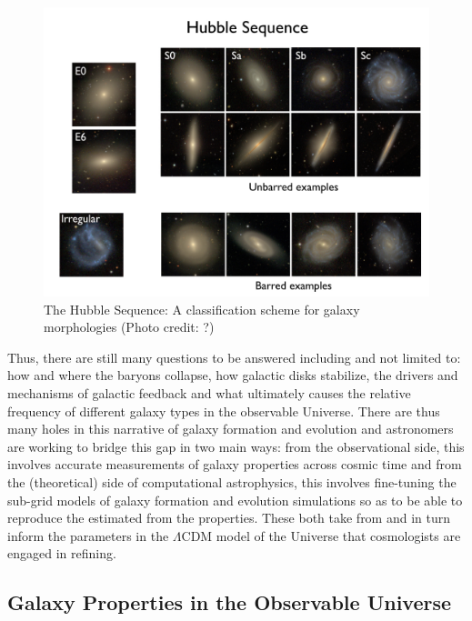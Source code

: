 \begin{figure}
\includegraphics[width=\textwidth]{figures/hubble.jpeg}
\caption[ The Hubble Sequence: A classification scheme for galaxy morphologies (Photo credit: ?)]
{The Hubble Sequence: A classification scheme for galaxy morphologies (Photo credit: ?)
\label{fig:hubble_classification}}
\end{figure}

Thus, there are still many questions to be answered including and not limited to: how and where the baryons collapse, how galactic disks stabilize, the drivers and mechanisms of galactic feedback and what ultimately causes the relative frequency of different galaxy types in the observable Universe. There are thus many holes in this narrative of galaxy formation and evolution and astronomers are working to bridge this gap in two main ways: from the observational side, this involves accurate measurements of galaxy properties across cosmic time and from the (theoretical) side of computational astrophysics, this involves fine-tuning the sub-grid models of galaxy formation and evolution simulations so as to be able to reproduce the estimated from the properties. These both take from and in turn inform the parameters in the $\Lambda$CDM model of the Universe that cosmologists are engaged in refining.\\

\subsection{Galaxy Properties in the Observable Universe}
\label{sec: gal_prop}

